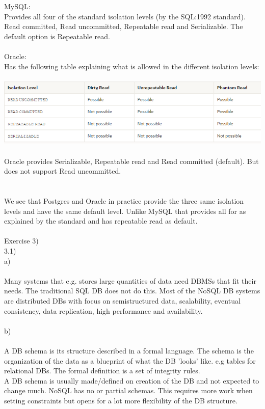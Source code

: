 \documentclass[12pt, letterpaper, twoside]{article}
\begin{document}
MySQL:\\
Provides all four of the standard isolation levels (by the SQL:1992 standard). Read committed, Read uncommitted, Repeatable read and Serializable. The default option is Repeatable read.\\
\newpage
\ \\
Oracle:\\
Has the following table explaining what is allowed in the different isolation levels:\\
\ \\
\includegraphics[scale=0.7]{"Oracle.png"}
\ \\
Oracle provides Serializable, Repeatable read and Read committed (default). But does not support Read uncommitted.\\
\ \\
\ \\
We see that Postgres and Oracle in practice provide the three same isolation levels and have the same default level. Unlike MySQL that provides all for as explained by the standard and has repeatable read as default.\\
\ \\
Exercise 3)\\
3.1)\\
a)\\
\ \\
Many systems that e.g. stores large quantities of data need DBMSs that fit their needs. The traditional SQL DB does not do this. Most of the NoSQL DB systems are distributed DBs with focus on semistructured data, scalability, eventual consistency, data replication, high performance and availability.\\
\newpage
\ \\
b)\\
\ \\
A DB schema is its structure described in a formal language. The schema is the organization of the data as a blueprint of what the DB 'looks' like. e.g tables for relational DBs. The formal definition is a set of integrity rules.\\
A DB schema is usually made/defined on creation of the DB and not expected to change much. NoSQL has no or partial schemas. This requires more work when setting constraints but opens for a lot more flexibility of the DB structure.\\
\end{document}
